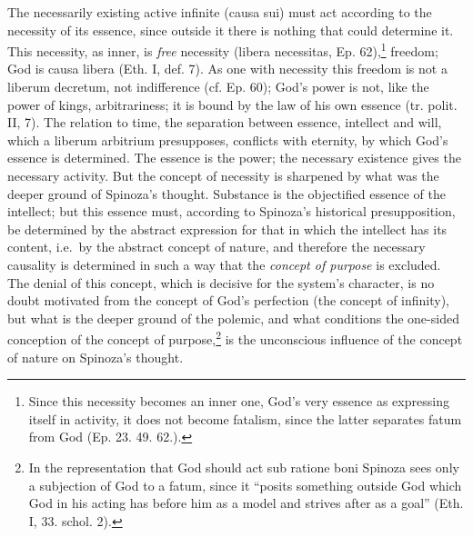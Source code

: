 \documentclass[12pt,a4paper,openany]{book}
\newcommand{\opage}[1]{\marginnote{\footnotesize\textit{[#1]}}}
\begin{document}
\opage{66}\setcounter{footnote}{0}The necessarily existing active infinite (causa sui) must
act according to the necessity of its essence, since outside it there is nothing
that could determine it. This necessity, as inner, is
\emph{free} necessity (libera necessitas, Ep. 62),\footnote{Since this
necessity becomes an inner one, God's very essence as expressing itself
in activity, it does not become fatalism, since the latter separates fatum
from God (Ep. 23. 49. 62.).} freedom; God is causa libera (Eth. I,
def. 7). As one with necessity this freedom is not a
liberum decretum, not indifference (cf. Ep. 60); God's power is
not, like the power of kings, arbitrariness; it is bound by the law of his
own essence (tr. polit. II, 7). The relation to time, the
separation between essence, intellect and will, which a liberum
arbitrium presupposes, conflicts with eternity, by which God's
essence is determined. The essence is the power; the necessary existence
gives the necessary activity. But the concept of necessity
is sharpened by what was the deeper ground of Spinoza's thought.
Substance is the objectified essence of the intellect; but this essence
must, according to Spinoza's historical presupposition, be determined by the
abstract expression for that in which the intellect has its content, i.e.\ by
the abstract concept of nature, and therefore the necessary
causality is determined in such a way that the \emph{concept of purpose} is excluded.
The denial of this concept, which is decisive for the system's
character, is no doubt motivated from the concept of God's perfection
(the concept of infinity), but what is the deeper ground of the polemic,
and what conditions the one-sided conception of the concept of
purpose,\footnote{In the representation that God should act sub
ratione boni Spinoza sees only a subjection of God to a
fatum, since it ``posits something outside God which God in his
acting has before him as a model and strives after as a
goal'' (Eth. I, 33. schol. 2).} is the unconscious
influence of the concept of nature on Spinoza's thought.
\end{document}
